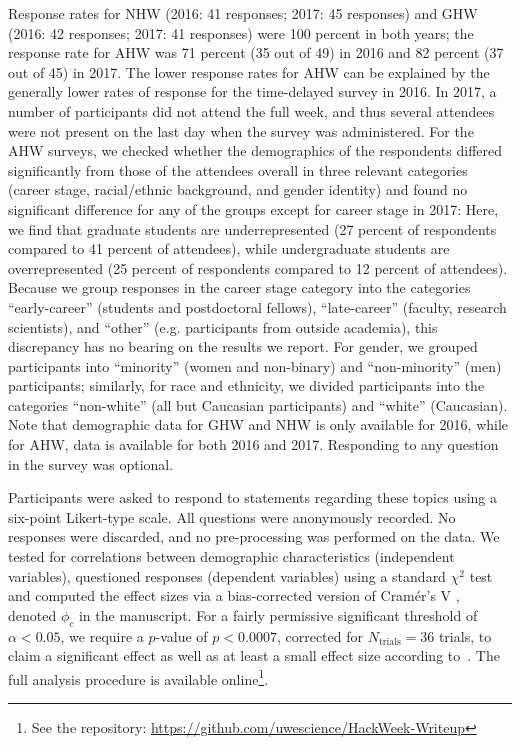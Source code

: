 \documentclass{aastex62}
\begin{document}
Response rates for NHW (2016: 41 responses; 2017: 45 responses) and GHW (2016: 42 responses; 2017: 41 responses) were 100 percent in both years; the response rate for AHW was 71 percent (35 out of 49) in 2016 and 82 percent (37 out of 45) in 2017. The lower response rates for AHW can be explained by the generally lower rates of response for the time-delayed survey in 2016. In 2017, a number of participants did not attend the full week, and thus several attendees were not present on the last day when the survey was administered. For the AHW surveys, we checked whether the demographics of the respondents diﬀered signiﬁcantly from those of the attendees overall in three relevant categories (career stage, racial/ethnic background, and gender identity) and found no signiﬁcant diﬀerence for any of the groups except for career stage in 2017: Here, we ﬁnd that graduate students are underrepresented (27 percent of respondents compared to 41 percent of attendees), while undergraduate students are overrepresented (25 percent of respondents compared to 12 percent of attendees). Because we group responses in the career stage category into the categories “early-career” (students and postdoctoral fellows), “late-career” (faculty, research scientists), and “other” (e.g. participants from outside academia), this discrepancy has no bearing on the results we report. For gender, we grouped participants into “minority” (women and non-binary) and “non-minority” (men) participants; similarly, for race and ethnicity, we divided participants into the categories “non-white” (all but Caucasian participants) and “white” (Caucasian). Note that demographic data for GHW and NHW is only available for 2016, while for AHW, data is available for both 2016 and 2017. Responding to any question in the survey was optional.



Participants were asked to respond to statements regarding these topics using a six-point Likert-type scale. All questions were anonymously recorded. No responses were discarded, and no pre-processing was performed on the data. We tested for correlations between demographic characteristics (independent variables), questioned responses (dependent variables) using a standard $\chi^2$ test and computed the effect sizes via a bias-corrected version of Cram\'{e}r's V \citep{cramer1946,bergsma2013}, denoted $\phi_c$ in the manuscript. For a fairly permissive significant threshold of $\alpha < 0.05$, we require a $p$-value of $p < 0.0007$, corrected for $N_\mathrm{trials} = 36$ trials, to claim a significant effect as well as at least a small effect size according to~\citep{cohen1988}. The full analysis procedure is available online\footnote{See the repository: \url{https://github.com/uwescience/HackWeek-Writeup}}.
\end{document}
